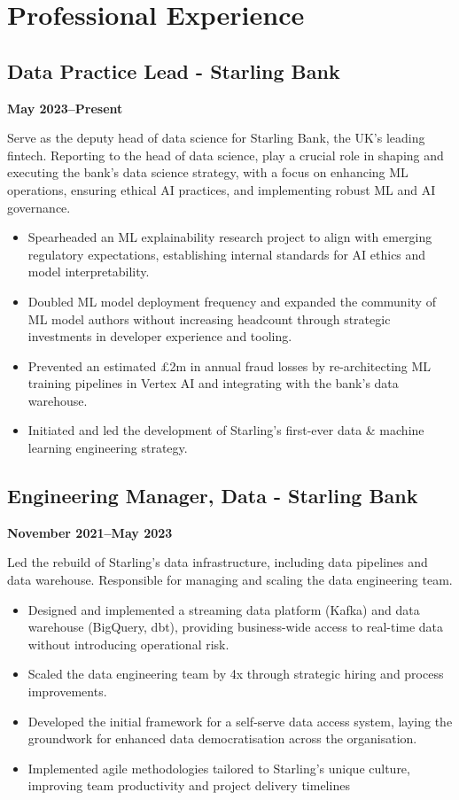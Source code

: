 \documentclass[a4paper]{scrartcl}
\begin{document}
\section*{Professional Experience}

\subsection*{Data Practice Lead - Starling Bank}
\textbf{May 2023--Present}

Serve as the deputy head of data science for Starling Bank, the UK's leading fintech. Reporting to the head of data science, play a crucial role in shaping and executing the bank's data science strategy, with a focus on enhancing ML operations, ensuring ethical AI practices, and implementing robust ML and AI governance.
\begin{itemize}
	\item Spearheaded an ML explainability research project to align with emerging regulatory expectations, establishing internal standards for AI ethics and model interpretability.
	\item Doubled ML model deployment frequency and expanded the community of ML model authors without increasing headcount through strategic investments in developer experience and tooling.
	\item Prevented an estimated £2m in annual fraud losses by re-architecting ML training pipelines in Vertex AI and integrating with the bank's data warehouse.
	\item Initiated and led the development of Starling's first-ever data \& machine learning engineering strategy.
\end{itemize}

\subsection*{Engineering Manager, Data - Starling Bank}
\textbf{November 2021--May 2023}

Led the rebuild of Starling's data infrastructure, including data pipelines and data warehouse. Responsible for managing and scaling the data engineering team.
\begin{itemize}
	\item Designed and implemented a streaming data platform (Kafka) and data warehouse (BigQuery, dbt), providing business-wide access to real-time data without introducing operational risk.
	\item Scaled the data engineering team by 4x through strategic hiring and process improvements.
	\item Developed the initial framework for a self-serve data access system, laying the groundwork for enhanced data democratisation across the organisation.
	\item Implemented agile methodologies tailored to Starling's unique culture, improving team productivity and project delivery timelines
\end{itemize}
\end{document}

